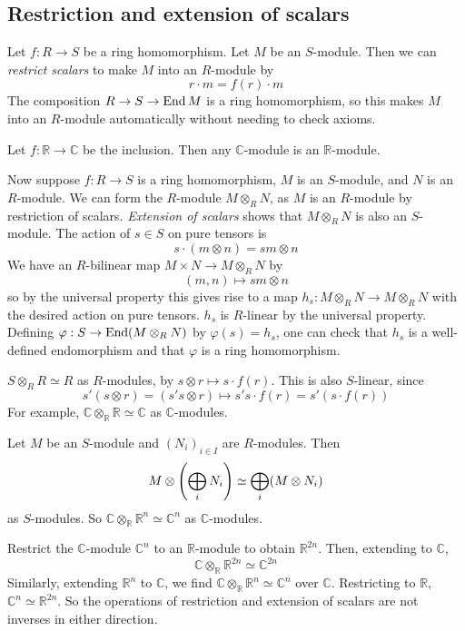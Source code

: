 \subsection{Restriction and extension of scalars}
Let \( f : R \to S \) be a ring homomorphism.
Let \( M \) be an \( S \)-module.
Then we can \emph{restrict scalars} to make \( M \) into an \( R \)-module by
\[ r \cdot m = f(r) \cdot m \]
The composition \( R \to S \to \operatorname{End} M \) is a ring homomorphism, so this makes \( M \) into an \( R \)-module automatically without needing to check axioms.
\begin{example}
    Let \( f : \mathbb R \to \mathbb C \) be the inclusion.
    Then any \( \mathbb C \)-module is an \( \mathbb R \)-module.
\end{example}

Now suppose \( f : R \to S \) is a ring homomorphism, \( M \) is an \( S \)-module, and \( N \) is an \( R \)-module.
We can form the \( R \)-module \( M \otimes_R N \), as \( M \) is an \( R \)-module by restriction of scalars.
\emph{Extension of scalars} shows that \( M \otimes_R N \) is also an \( S \)-module.
The action of \( s \in S \) on pure tensors is
\[ s \cdot (m \otimes n) = sm \otimes n \]
We have an \( R \)-bilinear map \( M \times N \to M \otimes_R N \) by
\[ (m, n) \mapsto sm \otimes n \]
so by the universal property this gives rise to a map \( h_s : M \otimes_R N \to M \otimes_R N \) with the desired action on pure tensors.
\( h_s \) is \( R \)-linear by the universal property.
Defining \( \varphi : S \to \operatorname{End}(M \otimes_R N) \) by \( \varphi(s) = h_s \), one can check that \( h_s \) is a well-defined endomorphism and that \( \varphi \) is a ring homomorphism.
\begin{example}
    \( S \otimes_R R \simeq R \) as \( R \)-modules, by \( s \otimes r \mapsto s \cdot f(r) \).
    This is also \( S \)-linear, since
    \[ s'(s \otimes r) = (s's \otimes r) \mapsto s's \cdot f(r) = s'(s \cdot f(r)) \]
    For example, \( \mathbb C \otimes_{\mathbb R} \mathbb R \simeq \mathbb C \) as \( \mathbb C \)-modules.
\end{example}
\begin{example}
    Let \( M \) be an \( S \)-module and \( (N_i)_{i \in I} \) are \( R \)-modules.
    Then
    \[ M \otimes \qty(\bigoplus_i N_i) \simeq \bigoplus_i (M \otimes N_i) \]
    as \( S \)-modules.
    So \( \mathbb C \otimes_{\mathbb R} \mathbb R^n \simeq \mathbb C^n \) as \( \mathbb C \)-modules.
\end{example}
\begin{example}
    Restrict the \( \mathbb C \)-module \( \mathbb C^n \) to an \( \mathbb R \)-module to obtain \( \mathbb R^{2n} \).
    Then, extending to \( \mathbb C \),
    \[ \mathbb C \otimes_{\mathbb R} \mathbb R^{2n} \simeq \mathbb C^{2n} \]
    Similarly, extending \( \mathbb R^n \) to \( \mathbb C \), we find \( \mathbb C \otimes_{\mathbb R} \mathbb R^n \simeq \mathbb C^n \) over \( \mathbb C \).
    Restricting to \( \mathbb R \), \( \mathbb C^n \simeq \mathbb R^{2n} \).
    So the operations of restriction and extension of scalars are not inverses in either direction.
\end{example}
